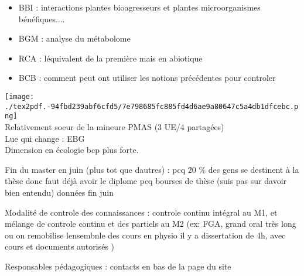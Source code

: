 \documentclass[
]{article}
\providecommand{\tightlist}{%
  \setlength{\itemsep}{0pt}\setlength{\parskip}{0pt}}
\begin{document}
\begin{itemize}
\tightlist
\item
  BBI : interactions plantes bioagresseurs et plantes microorganismes
  bénéfiques....
\item
  BGM : analyse du métabolome
\item
  RCA : l\textquotesingle équivalent de la première mais en abiotique
\item
  BCB : comment peut ont utiliser les notions précédentes pour controler
\end{itemize}

\texttt{[image: ./tex2pdf.-94fbd239abf6cfd5/7e798685fc885fd4d6ae9a80647c5a4db1dfcebc.png]}\\
Relativement soeur de la mineure PMAS (3 UE/4 partagées)\\
L\textquotesingle ue qui change : EBG\\
Dimension en écologie bcp plus forte.

Fin du master en juin (plus tot que d\textquotesingle autres) : pcq 20
\% des gens se destinent à la thèse donc faut déjà avoir le diplome pcq
bourses de thèse (suis pas sur d\textquotesingle avoir bien entendu)
données fin juin

Modalité de controle des connaissances : controle continu intégral au
M1, et mélange de controle continu et des partiels au M2 (ex: FGA, grand
oral très long ou on remobilise l\textquotesingle ensembnle des cours
\textbar{} en physio il y a dissertation de 4h, avec cours et documents
autorisés )

Responsables pédagogiques : contacts en bas de la page du site
\end{document}
